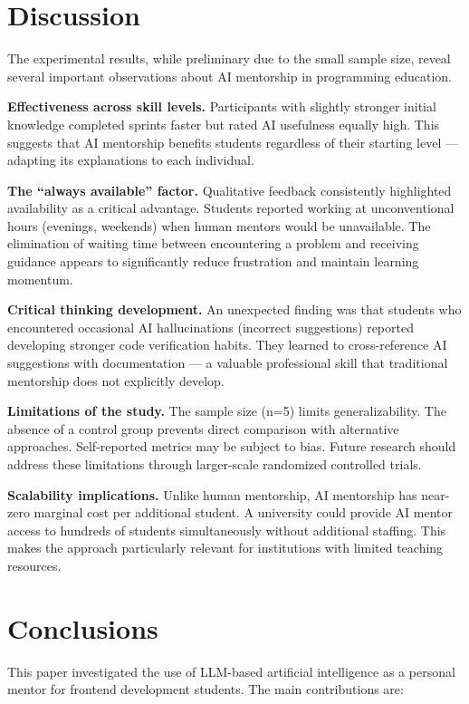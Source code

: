 \documentclass[conference,a4paper]{IEEEtran}
\begin{document}
\section{Discussion}

The experimental results, while preliminary due to the small sample size, reveal several important observations about AI mentorship in programming education.

\textbf{Effectiveness across skill levels.} Participants with slightly stronger initial knowledge completed sprints faster but rated AI usefulness equally high. This suggests that AI mentorship benefits students regardless of their starting level --- adapting its explanations to each individual.

\textbf{The ``always available'' factor.} Qualitative feedback consistently highlighted availability as a critical advantage. Students reported working at unconventional hours (evenings, weekends) when human mentors would be unavailable. The elimination of waiting time between encountering a problem and receiving guidance appears to significantly reduce frustration and maintain learning momentum.

\textbf{Critical thinking development.} An unexpected finding was that students who encountered occasional AI hallucinations (incorrect suggestions) reported developing stronger code verification habits. They learned to cross-reference AI suggestions with documentation --- a valuable professional skill that traditional mentorship does not explicitly develop.

\textbf{Limitations of the study.} The sample size (n=5) limits generalizability. The absence of a control group prevents direct comparison with alternative approaches. Self-reported metrics may be subject to bias. Future research should address these limitations through larger-scale randomized controlled trials.

\textbf{Scalability implications.} Unlike human mentorship, AI mentorship has near-zero marginal cost per additional student. A university could provide AI mentor access to hundreds of students simultaneously without additional staffing. This makes the approach particularly relevant for institutions with limited teaching resources.

\section{Conclusions}

This paper investigated the use of LLM-based artificial intelligence as a personal mentor for frontend development students. The main contributions are:
\end{document}
